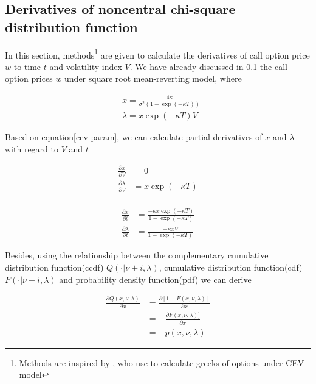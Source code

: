 \subsection{Derivatives of noncentral chi-square distribution function}
\label{sec: 3.2}

In this section, methods\footnote{Methods are inspired by \cite{hossain_comparison_2019}, who use to calculate greeks of options under CEV model} are given to calculate the derivatives of call option price $\bar{w}$ to time $t$ and volatility index $V$. We have already discussed in \ref{sec: 3.2} the call option prices $\bar{w}$ under square root mean-reverting model, where

\begin{equation}\label{cev param}
    \begin{aligned}
        &x=\frac{4 \kappa}{\sigma^{2}(1-\exp (-\kappa T))} \\
        &\lambda=x \exp (-\kappa T) V
        \end{aligned}
\end{equation}

Based on equation\eqref{cev param}, we can calculate partial derivatives of $x$ and $\lambda$ with regard to $V$ and $t$

\begin{equation}\label{params dv}
    \begin{aligned}
        \frac{\partial x}{\partial V}&=0\\
        \frac{\partial \lambda}{\partial V}&=x \exp (-\kappa T)  \\
    \end{aligned}
\end{equation}

\begin{equation}\label{params dt}
    \begin{aligned}
        \frac{\partial x}{\partial t}&= \frac{-\kappa x \exp(- \kappa T)}{1 - \exp(- \kappa T)}\\
        \frac{\partial \lambda}{\partial t}& =\frac{-\kappa x V }{1 - \exp(- \kappa T)}
    \end{aligned}
\end{equation}

Besides, using the relationship between the complementary cumulative distribution function(ccdf) $Q(\cdot | \nu+i, \lambda)$, cumulative distribution function(cdf) $F(\cdot | \nu+i, \lambda)$ and probability density function(pdf) we can derive

\begin{equation}\label{q dx}
    \begin{aligned}
        \frac{\partial Q(x, \nu, \lambda)}{\partial x}&=\frac{\partial[1-F(x, \nu, \lambda)]}{\partial x} \\ 
        &=-\frac{\partial F(x, \nu, \lambda)]}{\partial x} \\
        &=-p(x, \nu, \lambda)
        \end{aligned}
\end{equation}

